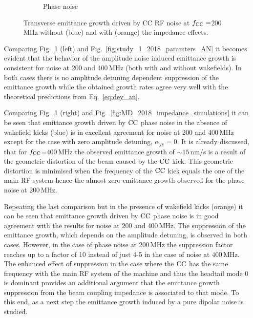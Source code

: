 \begin{figure}[!ht]
\begin{subfigure}[t]{0.45\textwidth}
        \caption{Phase noise}
    \end{subfigure}
    \hfill
     \caption{Transverse emittance growth driven by CC RF noise at ${f_\mathrm{CC}}=$200\,MHz without (blue) and with (orange) the impedance effects.} %
     \label{fig:CC_200MHz_amplitude_phase_noise}
 \end{figure}

 Comparing Fig.~\ref{fig:CC_200MHz_amplitude_phase_noise} (left) and Fig.~\ref{fig:study_1_2018_paramters_AN} it becomes evident that the behavior of the amplitude noise induced emittance growth is consistent for noise at 200 and 400\,MHz (both with and without wakefields). In both cases there is no amplitude detuning dependent suppression of the emittance growth while the obtained growth rates agree very well with the theoretical predictions from Eq.~\eqref{eq:dey_an}.
 
 Comparing Fig.~\ref{fig:CC_200MHz_amplitude_phase_noise} (right) and Fig.~\ref{fig:MD_2018_impedance_simulations} it can be seen that emittance growth driven by ${\mathrm{CC}}$ phase noise in the absence of wakefield kicks (blue) is in excellent agreement for noise at 200 and 400\,MHz except for the case with zero amplitude detuning, $\alpha_\mathrm{yy}=0$. It is already discussed, that for ${f_\mathrm{CC}}$=400\,MHz the observed emittance growth of $\sim 15$\,nm/s is a result of the geometric distortion of the beam caused by the ${\mathrm{CC}}$ kick. This geometric distortion is minimised when the frequency of the ${\mathrm{CC}}$ kick equals the one of the main RF system hence the almost zero emittance growth observed for the phase noise at 200\,MHz. 

 Repeating the last comparison but in the presence of wakefield kicks (orange) it can be seen that emittance growth driven by ${\mathrm{CC}}$ phase noise is in good agreement with the results for noise at 200 and 400\,MHz. The suppression of the emittance growth, which depends on the amplitude detuning, is observed in both cases. However, in the case of phase noise at 200\,MHz the suppression factor reaches up to a factor of 10 instead of just 4-5 in the case of noise at 400\,MHz. The enhanced effect of suppression in the case where the ${\mathrm{CC}}$ has the same frequency with the main RF system of the machine and thus the headtail mode 0 is dominant provides an additional argument that the emittance growth suppression from the beam coupling impedance is associated to that mode. To this end, as a next step the emittance growth induced by a pure dipolar noise is studied.


